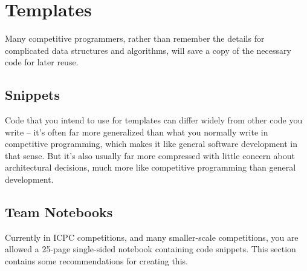 \section{Templates}

Many competitive programmers, rather than remember the details for complicated data structures and algorithms, will save a copy of the necessary code for later reuse.

\subsection{Snippets}

Code that you intend to use for templates can differ widely from other code you write -- it's often far more generalized than what you normally write in competitive programming, which makes it like general software development in that sense. But it's also usually far more compressed with little concern about architectural decisions, much more like competitive programming than general development.

\subsection{Team Notebooks}

Currently in ICPC competitions, and many smaller-scale competitions, you are allowed a 25-page single-sided notebook containing code snippets. This section contains some recommendations for creating this.

